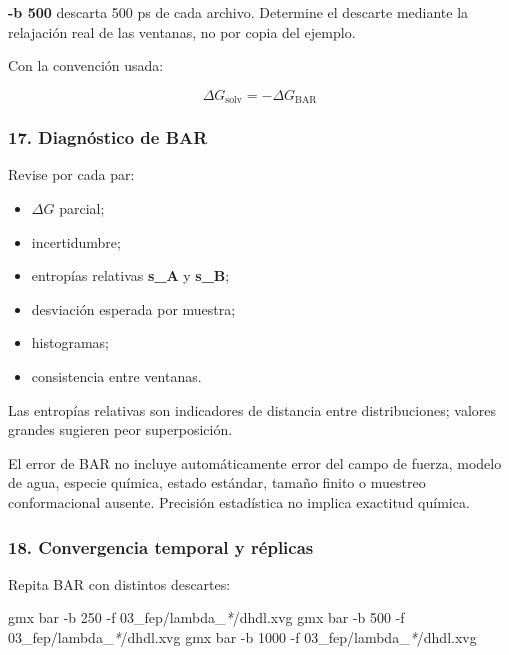 \documentclass[
  spanish,
  11pt,
  a4paper]{article}
\newenvironment{Shaded}{\begin{snugshade}}{\end{snugshade}}
\newcommand{\AttributeTok}[1]{\textcolor[rgb]{0.13,0.29,0.53}{#1}}
\newcommand{\ExtensionTok}[1]{#1}
\newcommand{\NormalTok}[1]{#1}
\newcommand{\PreprocessorTok}[1]{\textcolor[rgb]{0.56,0.35,0.01}{\textit{#1}}}
\providecommand{\tightlist}{%
  \setlength{\itemsep}{0pt}\setlength{\parskip}{0pt}}
\begin{document}
\textbf{-b 500} descarta 500 ps de cada archivo. Determine el descarte
mediante la relajación real de las ventanas, no por copia del ejemplo.

Con la convención usada:

\[
\Delta G_{\mathrm{solv}}
=
-\Delta G_{\mathrm{BAR}}
\]

\subsubsection{17. Diagnóstico de BAR}\label{diagnuxf3stico-de-bar}

Revise por cada par:

\begin{itemize}
\tightlist
\item
  \(\Delta G\) parcial;
\item
  incertidumbre;
\item
  entropías relativas \textbf{s\_A} y \textbf{s\_B};
\item
  desviación esperada por muestra;
\item
  histogramas;
\item
  consistencia entre ventanas.
\end{itemize}

Las entropías relativas son indicadores de distancia entre
distribuciones; valores grandes sugieren peor superposición.

El error de BAR no incluye automáticamente error del campo de fuerza,
modelo de agua, especie química, estado estándar, tamaño finito o
muestreo conformacional ausente. Precisión estadística no implica
exactitud química.

\subsubsection{18. Convergencia temporal y
réplicas}\label{convergencia-temporal-y-ruxe9plicas}

Repita BAR con distintos descartes:

\begin{Shaded}
\begin{Highlighting}[]
\ExtensionTok{gmx}\NormalTok{ bar }\AttributeTok{{-}b}\NormalTok{ 250  }\AttributeTok{{-}f}\NormalTok{ 03\_fep/lambda\_}\PreprocessorTok{*}\NormalTok{/dhdl.xvg}
\ExtensionTok{gmx}\NormalTok{ bar }\AttributeTok{{-}b}\NormalTok{ 500  }\AttributeTok{{-}f}\NormalTok{ 03\_fep/lambda\_}\PreprocessorTok{*}\NormalTok{/dhdl.xvg}
\ExtensionTok{gmx}\NormalTok{ bar }\AttributeTok{{-}b}\NormalTok{ 1000 }\AttributeTok{{-}f}\NormalTok{ 03\_fep/lambda\_}\PreprocessorTok{*}\NormalTok{/dhdl.xvg}
\end{Highlighting}
\end{Shaded}
\end{document}
